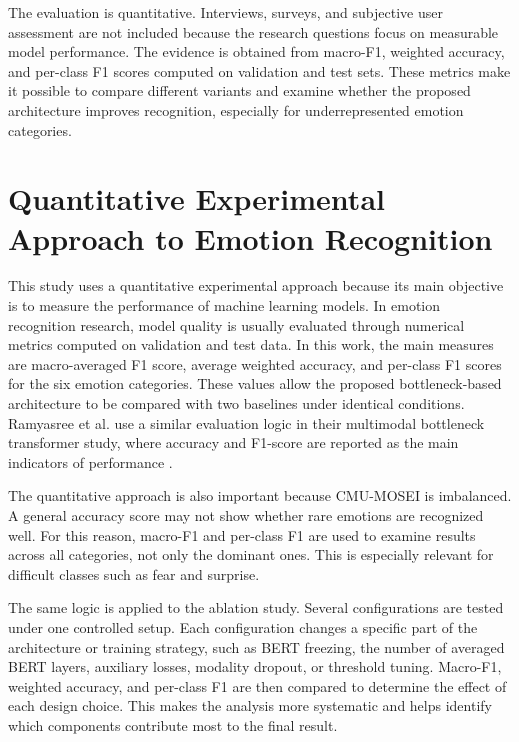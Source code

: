 The evaluation is quantitative. Interviews, surveys, and subjective user assessment are not included because the research questions focus on measurable model performance. The evidence is obtained from macro-F1, weighted accuracy, and per-class F1 scores computed on validation and test sets. These metrics make it possible to compare different variants and examine whether the proposed architecture improves recognition, especially for underrepresented emotion categories.

\section{Quantitative Experimental Approach to Emotion Recognition}
\label{sec:research_method}

This study uses a quantitative experimental approach because its main objective is to measure the performance of machine learning models. In emotion recognition research, model quality is usually evaluated through numerical metrics computed on validation and test data. In this work, the main measures are macro-averaged F1 score, average weighted accuracy, and per-class F1 scores for the six emotion categories. These values allow the proposed bottleneck-based architecture to be compared with two baselines under identical conditions. Ramyasree et al. use a similar evaluation logic in their multimodal bottleneck transformer study, where accuracy and F1-score are reported as the main indicators of performance \cite{ramyasree2025emotion}.

The quantitative approach is also important because CMU-MOSEI is imbalanced. A general accuracy score may not show whether rare emotions are recognized well. For this reason, macro-F1 and per-class F1 are used to examine results across all categories, not only the dominant ones. This is especially relevant for difficult classes such as fear and surprise.

The same logic is applied to the ablation study. Several configurations are tested under one controlled setup. Each configuration changes a specific part of the architecture or training strategy, such as BERT freezing, the number of averaged BERT layers, auxiliary losses, modality dropout, or threshold tuning. Macro-F1, weighted accuracy, and per-class F1 are then compared to determine the effect of each design choice. This makes the analysis more systematic and helps identify which components contribute most to the final result.

